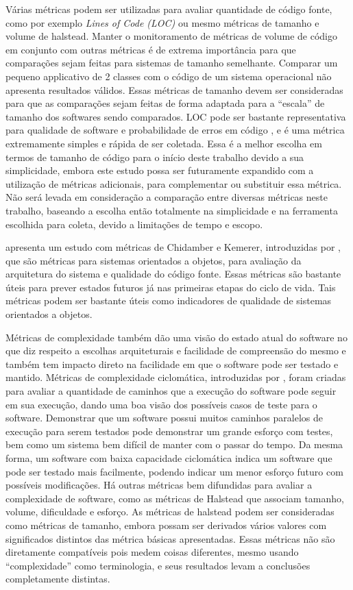 Várias métricas podem ser utilizadas para avaliar quantidade de código fonte, como por exemplo \textit{Lines of Code (LOC)} ou mesmo métricas de tamanho e volume de halstead. Manter o monitoramento de métricas de volume de código em conjunto com outras métricas é de extrema importância para que comparações sejam feitas para sistemas de tamanho semelhante. Comparar um pequeno applicativo de 2 classes com o código de um sistema operacional não apresenta resultados válidos. Essas métricas de tamanho devem ser consideradas para que as comparações sejam feitas de forma adaptada para a ``escala'' de tamanho dos softwares sendo comparados. LOC pode ser bastante representativa para qualidade de software e probabilidade de erros em código \cite{validationmetricsfaultprediction}, e é uma métrica extremamente simples e rápida de ser coletada. Essa é a melhor escolha em termos de tamanho de código para o início deste trabalho devido a sua simplicidade, embora este estudo possa ser futuramente expandido com a utilização de métricas adicionais, para complementar ou substituir essa métrica. Não será levada em consideração a comparação entre diversas métricas neste trabalho, baseando a escolha então totalmente na simplicidade e na ferramenta escolhida para coleta, devido a limitações de tempo e escopo.

 apresenta um estudo com métricas de Chidamber e Kemerer, introduzidas por , que são métricas para sistemas orientados a objetos, para avaliação da arquitetura do sistema e qualidade do código fonte. Essas métricas são bastante úteis para prever estados futuros já nas primeiras etapas do ciclo de vida. Tais métricas podem ser bastante úteis como indicadores de qualidade de sistemas orientados a objetos\cite{ooasqualityindicators}. 

Métricas de complexidade também dão uma visão do estado atual do software no que diz respeito a escolhas arquiteturais e facilidade de compreensão do mesmo e também tem impacto direto na facilidade em que o software pode ser testado e mantido. Métricas de complexidade ciclomática, introduzidas por , foram criadas para avaliar a quantidade de caminhos que a execução do software pode seguir em sua execução, dando uma boa visão dos possíveis casos de teste para o software. Demonstrar que um software possui muitos caminhos paralelos de execução para serem testados pode demonstrar um grande esforço com testes, bem como um sistema bem difícil de manter com o passar do tempo. Da mesma forma, um software com baixa capacidade ciclomática indica um software que pode ser testado mais facilmente, podendo indicar um menor esforço futuro com possíveis modificações. Há outras métricas bem difundidas para avaliar a complexidade de software, como as métricas de Halstead que associam tamanho, volume, dificuldade e esforço. As métricas de halstead podem ser consideradas como métricas de tamanho, embora possam ser derivados vários valores com significados distintos das métrica básicas apresentadas. Essas métricas não são diretamente compatíveis pois medem coisas diferentes, mesmo usando ``complexidade'' como terminologia, e seus resultados levam a conclusões completamente distintas.

